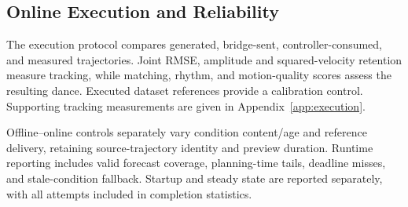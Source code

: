 \subsection{Online Execution and Reliability}
\label{sec:execution_results}
The execution protocol compares generated, bridge-sent, controller-consumed,
and measured trajectories. Joint RMSE, amplitude and squared-velocity retention
measure tracking, while matching, rhythm, and motion-quality scores assess the
resulting dance. Executed dataset references provide a calibration control.
Supporting tracking measurements are given in Appendix~\ref{app:execution}.

Offline--online controls separately vary condition content/age and reference
delivery, retaining source-trajectory identity and preview duration. Runtime
reporting includes valid forecast coverage, planning-time tails, deadline
misses, and stale-condition fallback. Startup and steady state are reported
separately, with all attempts included in completion statistics.
